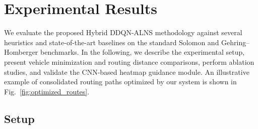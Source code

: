 \documentclass[conference]{IEEEtran}
\begin{document}
\section{Experimental Results}
\label{sec:results}

We evaluate the proposed Hybrid DDQN-ALNS methodology against several heuristics and state-of-the-art baselines on the standard Solomon and Gehring--Homberger benchmarks. In the following, we describe the experimental setup, present vehicle minimization and routing distance comparisons, perform ablation studies, and validate the CNN-based heatmap guidance module. An illustrative example of consolidated routing paths optimized by our system is shown in Fig.~\ref{fig:optimized_routes}.

\subsection{Setup}
\end{document}
